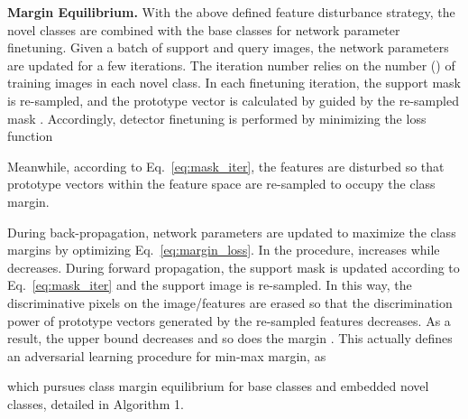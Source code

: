 \documentclass[final]{cvpr}
\begin{document}
\textbf{Margin Equilibrium.}
With the above defined feature disturbance strategy, the novel classes  are combined with the base classes  for network parameter finetuning.  Given a batch of support and query images, the network parameters are updated for a few iterations. The iteration number relies on the number () of training images in each novel class. In each finetuning iteration, the support mask is re-sampled, and the prototype vector is calculated by  guided by the re-sampled mask . Accordingly, detector finetuning is performed by minimizing the loss function

Meanwhile, according to Eq.~\ref{eq:mask_iter}, the features are disturbed so that prototype vectors within the feature space are re-sampled to occupy the class margin. 

During back-propagation, network parameters are updated to maximize the class margins  by optimizing Eq.\ \ref{eq:margin_loss}. In the procedure,  increases while  decreases. During forward propagation, the support mask  is updated according to Eq.\ \ref{eq:mask_iter} and the support image is re-sampled. In this way, the discriminative pixels on the image/features are erased so that the discrimination power of prototype vectors  generated by the re-sampled features decreases. As a result, the upper bound  decreases and so does the margin .
This actually defines an adversarial learning procedure for min-max margin, as

which pursues class margin equilibrium for base classes and embedded novel classes, detailed in Algorithm {\color{red}1}.
\end{document}
